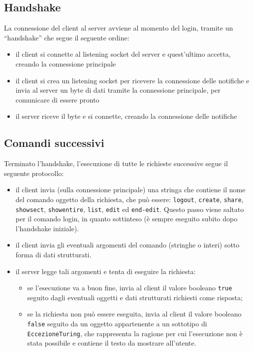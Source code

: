 \documentclass[a4paper,12pt]{article}
\begin{document}
 \subsection{ Handshake }
 La connessione del client al server avviene al momento del login, tramite un ``handshake'' che segue il seguente ordine:
 \begin{itemize}
  \item il client si connette al listening socket del server e quest'ultimo accetta, creando la connessione principale
  \item il client si crea un listening socket per ricevere la connessione delle notifiche e invia al server un byte di dati tramite la connessione principale, per comunicare di essere pronto
   \item il server riceve il byte e si connette, creando la connessione delle notifiche
 \end{itemize}
 
 \subsection{ Comandi successivi }

 Terminato l'handshake, l'esecuzione di tutte le richieste successive segue il seguente protocollo:
 \begin{itemize}
  \item il client invia (sulla connessione principale) una stringa che contiene il nome del comando oggetto della richiesta, che può essere: \texttt{logout}, \texttt{create}, \texttt{share}, \texttt{showsect}, \texttt{showentire}, \texttt{list}, \texttt{edit} ed \texttt{end-edit}. Questo passo viene saltato per il comando login, in quanto sottinteso (è sempre eseguito subito dopo l'handshake iniziale).
   \item il client invia gli eventuali argomenti del comando (stringhe o interi) sotto forma di dati strutturati.
   \item il server legge tali argomenti e tenta di eseguire la richiesta:
   \begin{itemize}
    \item se l'esecuzione va a buon fine, invia al client il valore booleano \texttt{true} seguito dagli eventuali oggetti e dati strutturati richiesti come risposta;
     \item se la richiesta non può essere eseguita, invia al client il valore booleano \texttt{false} seguito da un oggetto appartenente a un sottotipo di \texttt{EccezioneTuring}, che rappresenta la ragione per cui l'esecuzione non è stata possibile e contiene il testo da mostrare all'utente.
   \end{itemize}

 \end{itemize}
\end{document}
